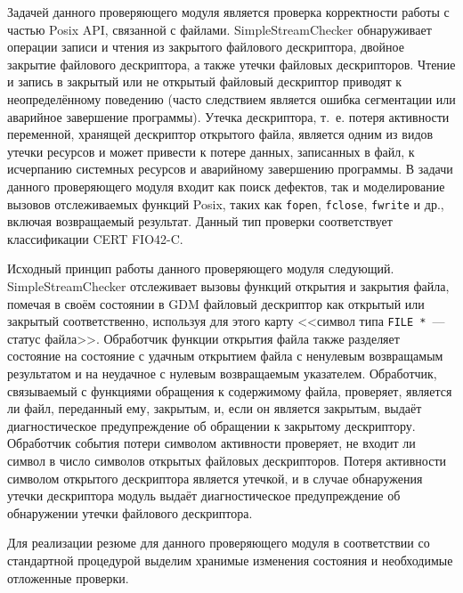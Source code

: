 Задачей данного проверяющего модуля является проверка корректности работы с частью Posix API, связанной с файлами. SimpleStreamChecker обнаруживает операции записи и чтения из закрытого файлового дескриптора, двойное закрытие файлового дескриптора, а также утечки файловых дескрипторов. Чтение и запись в закрытый или не открытый файловый дескриптор приводят к неопределённому поведению (часто следствием является ошибка сегментации или аварийное завершение программы). Утечка дескриптора, т.~е. потеря активности переменной, хранящей дескриптор открытого файла, является одним из видов утечки ресурсов и может привести к потере данных, записанных в файл, к исчерпанию системных ресурсов и аварийному завершению программы. В задачи данного проверяющего модуля входит как поиск дефектов, так и моделирование вызовов отслеживаемых функций Posix, таких как \texttt{fopen}, \texttt{fclose}, \texttt{fwrite} и др., включая возвращаемый результат. Данный тип проверки соответствует классификации CERT FIO42-C.

Исходный принцип работы данного проверяющего модуля следующий. SimpleStreamChecker отслеживает вызовы функций открытия и закрытия файла, помечая в своём состоянии в GDM файловый дескриптор как открытый или закрытый соответственно, используя для этого карту <<символ типа \texttt{FILE~*}~--- статус файла>>. Обработчик функции открытия файла также разделяет состояние на состояние с удачным открытием файла с ненулевым возвращамым результатом и на неудачное с нулевым возвращаемым указателем. Обработчик, связываемый с функциями обращения к содержимому файла, проверяет, является ли файл, переданный ему, закрытым, и, если он является закрытым, выдаёт диагностическое предупреждение об обращении к закрытому дескриптору. Обработчик события потери символом активности проверяет, не входит ли символ в число символов открытых файловых дескрипторов. Потеря активности символом открытого дескриптора является утечкой, и в случае обнаружения утечки дескриптора модуль выдаёт диагностическое предупреждение об обнаружении утечки файлового дескриптора.

Для реализации резюме для данного проверяющего модуля в соответствии со стандартной процедурой выделим хранимые изменения состояния и необходимые отложенные проверки.

